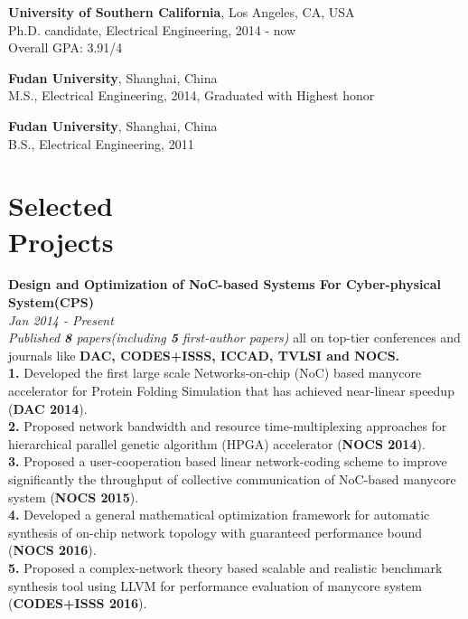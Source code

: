 \documentclass[margin,line]{cv}
\begin{document}
\begin{resume}
    \textbf{University of Southern California}, Los Angeles, CA, USA\\
    Ph.D. candidate, Electrical Engineering, 2014 - now\\
    Overall GPA: 3.91/4
    
    \textbf{Fudan University}, Shanghai, China\\
    M.S., Electrical Engineering, 2014, Graduated with Highest honor
    
    \textbf{Fudan University}, Shanghai, China\\
    B.S., Electrical Engineering, 2011 \\


    \section{\mysidestyle Selected \\ Projects}
\textbf{Design and Optimization of NoC-based Systems For Cyber-physical System(CPS)}  \\ \textit{Jan 2014 - Present}\\
\textit{Published \textbf{8} papers(including \textbf{5} first-author papers)} all on top-tier conferences and journals like \textbf{DAC, CODES+ISSS, ICCAD, TVLSI and NOCS.} \\
\textbf{1.} Developed the first large scale Networks-on-chip (NoC) based manycore accelerator for Protein Folding Simulation that has achieved near-linear speedup (\textbf{DAC 2014}).\\
\textbf{2.} Proposed network bandwidth and resource time-multiplexing approaches for hierarchical parallel genetic algorithm (HPGA) accelerator (\textbf{NOCS 2014}).\\
\textbf{3.} Proposed a user-cooperation based linear network-coding scheme to improve significantly the throughput of collective communication of NoC-based manycore system (\textbf{NOCS 2015}).\\
\textbf{4.} Developed a general mathematical optimization framework for automatic synthesis of on-chip network topology with guaranteed performance bound (\textbf{NOCS 2016}).\\
\textbf{5.} Proposed a complex-network theory based scalable and realistic benchmark synthesis tool using LLVM for performance evaluation of manycore system (\textbf{CODES+ISSS 2016}).


\end{resume}
\end{document}
